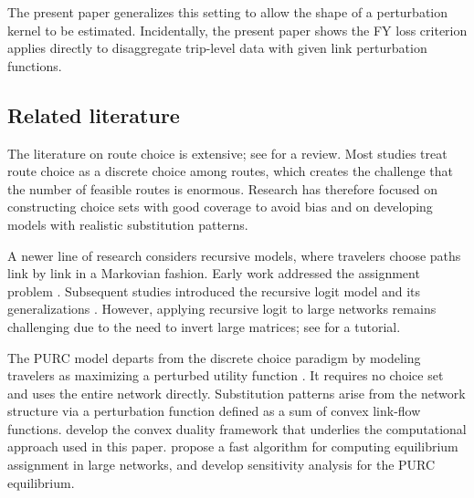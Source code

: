 \documentclass[12pt]{article}
\begin{document}
The present paper generalizes this setting to allow the shape of a perturbation kernel to be estimated. Incidentally, the present paper shows the FY loss criterion applies directly to disaggregate trip-level data with given link perturbation functions.



\subsection{Related literature}

The literature on route choice is extensive; see \citet{prato_route_2009} for a review. Most studies treat route choice as a discrete choice among routes, which creates the challenge that the number of feasible routes is enormous. Research has therefore focused on constructing choice sets with good coverage to avoid bias and on developing models with realistic substitution patterns.

A newer line of research considers recursive models, where travelers choose paths link by link in a Markovian fashion. Early work addressed the assignment problem \citep{Dial1971, bell_alternatives_1995, baillon_markovian_2008}. Subsequent studies introduced the recursive logit model and its generalizations \citep{fosgerau_link_2013, Mai2015a, mai_method_2016}. However, applying recursive logit to large networks remains challenging due to the need to invert large matrices; see \citet{zimmermann_tutorial_2020} for a tutorial.

The PURC model \citep{fosgerau2022perturbed, fosgerau2023bikeability} departs from the discrete choice paradigm by modeling travelers as maximizing a perturbed utility function \citep{fosgerau2012theory}. It requires no choice set and uses the entire network directly. Substitution patterns arise from the network structure via a perturbation function defined as a sum of convex link-flow functions. \citet{fosgerau_convex_2026} develop the convex duality framework that underlies the computational approach used in this paper. \citet{yao_perturbed_2024} propose a fast algorithm for computing equilibrium assignment in large networks, and \citet{fosgerau_sensitivity_2025} develop sensitivity analysis for the PURC equilibrium.
\end{document}
